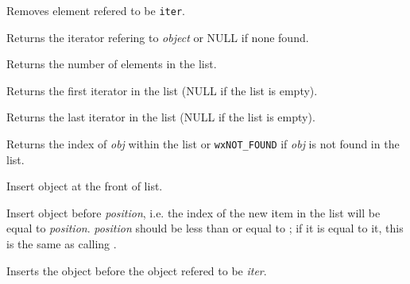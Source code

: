Removes element refered to be {\tt iter}.

\label{wxlistfind}


Returns the iterator refering to {\it object} or NULL if none found.

\label{wxlistgetcount}


Returns the number of elements in the list.

\label{wxlistgetfirst}


Returns the first iterator in the list (NULL if the list is empty).

\label{wxlistgetlast}


Returns the last iterator in the list (NULL if the list is empty).

\label{wxlistindexof}


Returns the index of {\it obj} within the list or {\tt wxNOT\_FOUND} if
{\it obj} is not found in the list.

\label{wxlistinsert}


Insert object at the front of list.


Insert object before {\it position}, i.e. the index of the new item in the
list will be equal to {\it position}. {\it position} should be less than or
equal to ; if it is equal to it, this is the
same as calling .


Inserts the object before the object refered to be {\it iter}.

